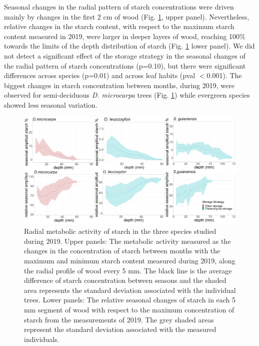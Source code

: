 \documentclass{article}
\begin{document}
 
Seasonal changes in the radial pattern of starch concentrations were driven mainly by changes in the first 2 cm of wood (Fig. \ref{fig:starch_radial_activity}, upper panel). Nevertheless, relative changes in the starch content, with respect to the maximum starch content measured in 2019, were larger in deeper layers of wood, reaching 100\% towards the limits of the depth distribution of starch (Fig. \ref{fig:starch_radial_activity} lower panel). We did not detect a significant effect of the storage strategy in the seasonal changes of the radial pattern of starch concentrations (p=0.10), but there were significant differences across species (p=0.01) and across leaf habits (pval $< $0.001). The biggest changes in starch concentration between months, during 2019, were observed for semi-deciduous \textit{D. microcarpa} trees (Fig. \ref{fig:starch_radial_activity}) while evergreen species showed less seasonal variation. 



 \begin{figure}[h] %
   \centering
   \includegraphics[width=5.5in]{Figure3.png} 
   \caption{Radial metabolic activity of starch in the three species studied during 2019. Upper panels: The metabolic activity measured as the changes in the concentration of starch between months with the maximum and minimum starch content measured during 2019, along the radial profile of wood every 5 mm. The black line is the average difference of starch concentration between seasons and the shaded area represents the standard deviation associated with the individual trees. Lower panels: The relative seasonal  changes of starch in each 5 mm segment of wood with respect to the maximum concentration of starch from the measurements of 2019. The grey shaded areas represent the standard deviation associated with the measured individuals.}
   \label{fig:starch_radial_activity}
\end{figure}
\end{document}
